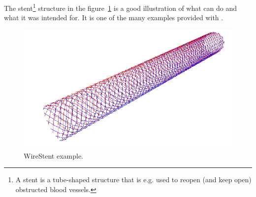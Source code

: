 The stent\footnote{A stent is a tube-shaped structure that is e.g. used to reopen (and keep open) obstructed blood vessels.} structure in the figure~\ref{fig:WireStent-example} is a good illustration of what \pyformex can do and what it was intended for. It is one of the many examples provided with \pyf.

\begin{figure}[ht]
  \centering
  \begin{makeimage}
  \end{makeimage}
  \begin{latexonly}
    \includegraphics[width=12cm]{images/wirestent}
  \end{latexonly}
  \begin{htmlonly}
  \end{htmlonly}  
  \caption{WireStent example.}   \label{fig:WireStent-example}

\end{figure}

